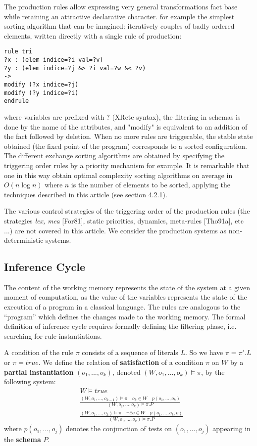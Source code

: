 The production rules allow expressing very general transformations
fact base while retaining an attractive declarative character. for example
the simplest sorting algorithm that can be imagined: iteratively
couples of badly ordered elements, written directly with a single rule of
production:
\begin{verbatim}
rule tri
?x : (elem indice=?i val=?v)
?y : (elem indice=?j &> ?i val=?w &< ?v)
->
modify (?x indice=?j)
modify (?y indice=?i)
endrule
\end{verbatim}
where variables are prefixed with ? (XRete syntax), the filtering in schemas is done
by the name of the attributes, and "modify" is equivalent to an addition of the fact followed by deletion.
When no more rules are triggerable, the stable state
obtained (the fixed point of the program) corresponds to a sorted configuration. The different
exchange sorting algorithms are obtained by specifying the triggering order
rules by a priority mechanism for example. It is remarkable that one
in this way obtain optimal complexity sorting algorithms on average
in $O(n  \log {n})$ where $n$ is the number of elements to be sorted, applying the techniques
described in this article (see section 4.2.1).

The various control strategies of the triggering order of the production rules
(the strategies \textit{lex, mea} [For81], static priorities, dynamics, meta-rules [Tho91a],
etc ...) are not covered in this article. We consider the production systems
as non-deterministic systems.

\subsection{Inference Cycle}

The content of the working memory represents the state of the system at a given moment
of computation, as the value of the variables represents the state of the execution of a program in a classical language. The rules are analogous to the ``program'' which
defines the changes made to the working memory. The formal definition of
inference cycle requires formally defining the filtering phase, i.e.
searching for rule instantiations.

A condition of the rule $\pi$ consists of a sequence of literals $L$. So we have
$\pi = \pi' . L$ or $\pi = true$.  We define the relation of \textbf{satisfaction} of a condition $\pi$ on
$W$ by a \textbf{partial instantiation} $(o_1, ..., o_k)$, denoted $(W, o_1, ..., o_k) \vDash \pi$, by the
following system:
\begin{eqnarray}
& W \vDash true \\
& \displaystyle \frac{(W, o_1, ..., o_{k-1}) \vDash \pi \quad o_k \in W \quad p(o_1, ... , o_k)}
{(W, o_1, ..., o_k) \vDash \pi . P} \\
& \displaystyle \frac{(W, o_1, ..., o_k) \vDash \pi \quad \neg \exists o \in W \quad p(o_1, ... , o_k, o)}
{(W, o_1, ..., o_k) \vDash \pi . P}
\end{eqnarray}
where $p(o_1, ..., o_j)$ denotes the conjunction of tests on $(o_1, ..., o_j)$ appearing in the
\textbf{schema} $P$.

